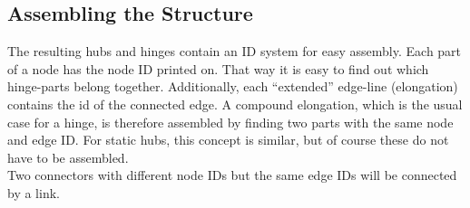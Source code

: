\subsection{Assembling the Structure}
The resulting hubs and hinges contain an ID system for easy assembly. Each part of a node has the node ID printed on. That way it is easy to find out which hinge-parts belong together. Additionally, each ``extended'' edge-line (elongation)  contains the id of the connected edge. A compound elongation, which is the usual case for a hinge, is therefore assembled by finding two parts with the same node and edge ID. For static hubs, this concept is similar, but of course these do not have to be assembled.\\
Two connectors with different node IDs but the same edge IDs will be connected by a link.
